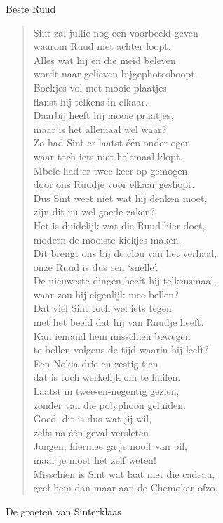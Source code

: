 \documentclass[12pt]{brief}
\begin{document}
\begin{letter}{Beste Ruud}
\begin{verse}
Sint zal jullie nog een voorbeeld geven\\
waarom Ruud niet achter loopt.\\
Alles wat hij en die meid beleven\\
wordt naar gelieven bijgephotoshoopt.\\[1.5em]

Boekjes vol met mooie plaatjes\\
flanst hij telkens in elkaar.\\
Daarbij heeft hij mooie praatjes,\\
maar is het allemaal wel waar?\\[1.5em]

Zo had Sint er laatst \'e\'en onder ogen\\
waar toch iets niet helemaal klopt.\\
Mbele had er twee keer op gemogen,\\
door ons Ruudje voor elkaar geshopt.\\[1.5em]

Dus Sint weet niet wat hij denken moet,\\
zijn dit nu wel goede zaken?\\
Het is duidelijk wat die Ruud hier doet,\\
modern de mooiste kiekjes maken.\\[1.5em]

Dit brengt ons bij de clou van het verhaal,\\
onze Ruud is dus een `snelle'.\\
De nieuweste dingen heeft hij telkensmaal,\\
waar zou hij eigenlijk mee bellen?\\[2.5em]

Dat viel Sint toch wel iets tegen\\
met het beeld dat hij van Ruudje heeft.\\
Kan iemand hem misschien bewegen\\
te bellen volgens de tijd waarin hij leeft?\\[1.5em]

Een Nokia drie-en-zestig-tien\\
dat is toch werkelijk om te huilen.\\
Laatst in twee-en-negentig gezien,\\
zonder van die polyphoon geluiden.\\[1.5em]

Goed, dit is dus wat jij wil,\\
zelfs na \'e\'en geval versleten.\\
Jongen, hiermee ga je nooit van bil,\\
maar je moet het zelf weten!\\[1.5em]

Misschien is Sint wat laat met die cadeau,\\
geef hem dan maar aan de Chemokar ofzo.\\[1.5em]

\end{verse}


De groeten van Sinterklaas


\closing{}

\end{letter}
\end{document}
